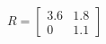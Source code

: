 \documentclass[preview]{standalone}
\begin{document}
\begin{align*}
R = \begin{bmatrix} 3.6 & 1.8 \\ {0} & 1.1 \end{bmatrix}
\end{align*}
\end{document}
